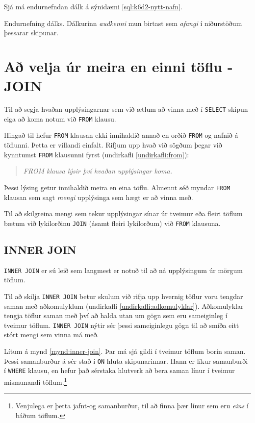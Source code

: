 Sjá má endurnefndan dálk á sýnidæmi \ref{sql:k6d2-nytt-nafn}.

\begin{example}
\caption[Endurnefning]{Endurnefning dálks. Dálkurinn \emph{audkenni} mun birtast sem \emph{afangi} í niðurstöðum þessarar skipunar.}
\label{sql:k6d2-nytt-nafn}
\centering
{}
\end{example}

\section{Að velja úr meira en einni töflu - JOIN}
\label{undirkafli:join}
Til að segja hvaðan upplýsingarnar sem við ætlum að vinna með í \verb|SELECT| skipun eiga að koma notum við \verb|FROM| klausu.

Hingað til hefur \verb|FROM| klausan ekki innihaldið annað en orðið \verb|FROM| og nafnið á töflunni. Þetta er villandi einfalt. Rifjum upp hvað við sögðum þegar við kynntumst \verb|FROM| klausunni fyrst (undirkafli \ref{undirkafli:from}):
\begin{quote}
\emph{FROM klausa lýsir því hvaðan upplýsingar koma.}
\end{quote}
Þessi lýsing getur innihaldið meira en eina töflu. Almennt séð myndar \verb|FROM| klausan sem sagt \emph{mengi} upplýsinga sem hægt er að vinna með.

Til að skilgreina mengi sem tekur upplýsingar sínar úr tveimur eða fleiri töflum bætum við lykilorðinu \verb|JOIN| (ásamt fleiri lykilorðum) við \verb|FROM| klausuna.

\subsection{INNER JOIN}
\verb|INNER JOIN| er sú leið sem langmest er notuð til að ná upplýsingum úr mörgum töflum. 

Til að skilja \verb|INNER JOIN| betur skulum við rifja upp hvernig töflur voru tengdar saman með aðkomulyklum (undirkafli \ref{undirkafli:adkomulyklar}).
Aðkomulyklar tengja töflur saman með því að halda utan um gögn sem eru sameiginleg í tveimur töflum. \verb|INNER JOIN| nýtir sér þessi sameiginlegu gögn til að smíða eitt stórt mengi sem vinna má með.

Lítum á mynd \ref{mynd:inner-join}. Þar má sjá gildi í tveimur töflum borin saman. Þessi samanburður á sér stað í \verb|ON| hluta skipunarinnar. Hann er líkur samanburði í \verb|WHERE| klausu, en hefur það sérstaka hlutverk að bera saman línur í tveimur mismunandi töflum.\footnote{Venjulega er þetta jafnt-og samanburður, til að finna þær línur sem eru \emph{eins} í báðum töflum.}

